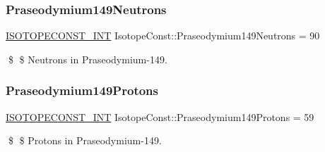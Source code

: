 \subsubsection{\texorpdfstring{Praseodymium149\+Neutrons}{Praseodymium149Neutrons}}
{\footnotesize\ttfamily \mbox{\hyperlink{group___isotope_const-_macros_ga5f18360b3e99483a35c32d789e62621c}{I\+S\+O\+T\+O\+P\+E\+C\+O\+N\+S\+T\+\_\+\+I\+NT}} Isotope\+Const\+::\+Praseodymium149\+Neutrons = 90}

\$ \$ Neutrons in Praseodymium-\/149. \mbox{\label{group___isotope_const-_praseodymium-_pr149_ga1877cf43bb378122b1e318f9ba36624c}} 
\subsubsection{\texorpdfstring{Praseodymium149\+Protons}{Praseodymium149Protons}}
{\footnotesize\ttfamily \mbox{\hyperlink{group___isotope_const-_macros_ga5f18360b3e99483a35c32d789e62621c}{I\+S\+O\+T\+O\+P\+E\+C\+O\+N\+S\+T\+\_\+\+I\+NT}} Isotope\+Const\+::\+Praseodymium149\+Protons = 59}

\$ \$ Protons in Praseodymium-\/149. 